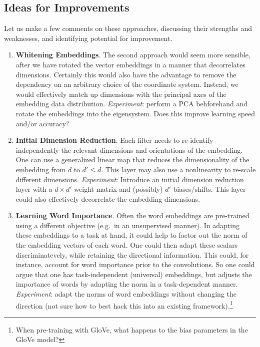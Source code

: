 \documentclass{article}
\begin{document}
\subsection*{Ideas for Improvements}

Let us make a few comments on these approaches, discussing their strengths and weaknesses, and identifying potential for improvement. 

\begin{enumerate}
\item \textbf{Whitening Embeddings}. The second approach would seem more sensible, after we have rotated the vector embeddings in a manner that decorrelates dimensions. Certainly this would also have the advantage to remove the dependency on an arbitrary choice of the coordinate system. Instead, we would effectively match up dimensions with the principal axes of the embedding data distribution. \textit{Experiment}: perform a PCA behforehand and rotate the embeddings into the eigensystem. Does this improve learning speed and/or accuracy? 
\item \textbf{Initial Dimension Reduction}. Each filter needs to re-identify independently the relevant dimensions and orientations of the embedding. One can use a generalized linear map that reduces the dimensionality of the embedding from $d$ to $d' \leq d$. This layer may also use a nonlinearity to re-scale different dimensions. \textit{Experiment}: Introduce an initial dimension reduction layer with a $d \times d'$ weight matrix and (possibly) $d'$ biases/shifts. This layer could also effectively decorrelate the embedding dimensions. 
\item \textbf{Learning Word Importance}. Often the word embeddings are pre-trained using a different objective (e.g.~in an unsupervised manner). In adapting these embeddings to a task at hand, it could help to factor out the norm of the embedding vectors of each word. One could then adapt these scalars discriminatevely, while retaining the directional information. This could, for instance, account for word importance prior to the convolutions. So one could argue that one has task-independent (universal) embeddings, but adjusts the importance of words by adapting the norm in a task-dependent manner.  \textit{Experiment}: adapt the norms of word embeddings without changing the direction (not sure how to best hack this into an existing framework).\footnote{When pre-training with GloVe, what happens to the bias parameters in the GloVe model?} 

\end{enumerate}
\end{document}
